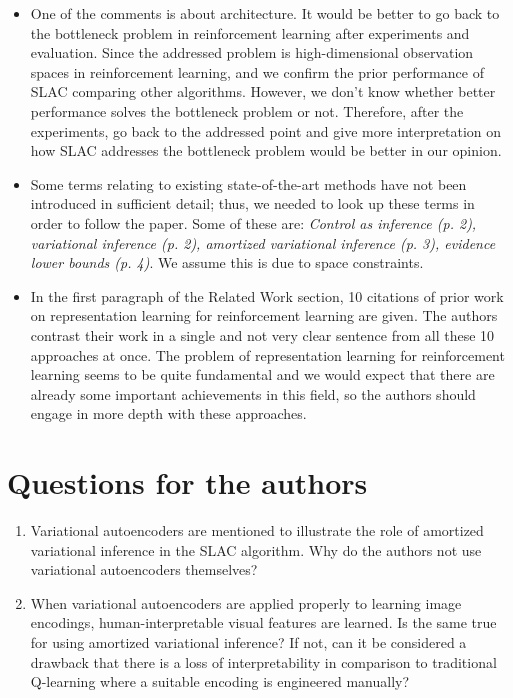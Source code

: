 \documentclass[letterpaper]{article} %
\begin{document}
\begin{itemize}
    \item One of the comments is about architecture. It would be better to go back to the bottleneck problem in reinforcement learning after experiments and evaluation. Since the addressed problem is high-dimensional observation spaces in reinforcement learning, and we confirm the prior performance of SLAC comparing other algorithms. However, we don't know whether better performance solves the bottleneck problem or not. Therefore, after the experiments, go back to the addressed point and give more interpretation on how SLAC addresses the bottleneck problem would be better in our opinion.
    \item Some terms relating to existing state-of-the-art methods have not been introduced in sufficient detail; thus, we needed to look up these terms in order to follow the paper. Some of these are: \textit{Control as inference (p. 2), variational inference (p. 2), amortized variational inference (p. 3), evidence lower bounds (p. 4)}. We assume this is due to space constraints.
    \item In the first paragraph of the Related Work section, 10 citations of prior work on representation learning for reinforcement learning are given. The authors contrast their work in a single and not very clear sentence from all these 10 approaches at once. The problem of representation learning for reinforcement learning seems to be quite fundamental and we would expect that there are already some important achievements in this field, so the authors should engage in more depth with these approaches.
\end{itemize}

\section{Questions for the authors}

\begin{enumerate}
    \item Variational autoencoders are mentioned to illustrate the role of amortized variational inference in the SLAC algorithm. Why do the authors not use variational autoencoders themselves?
    \item When variational autoencoders are applied properly to learning image encodings, human-interpretable visual features are learned. Is the same true for using amortized variational inference? If not, can it be considered a drawback that there is a loss of interpretability in comparison to traditional Q-learning where a suitable encoding is engineered manually?
\end{enumerate}





\printbibliography
\end{document}

